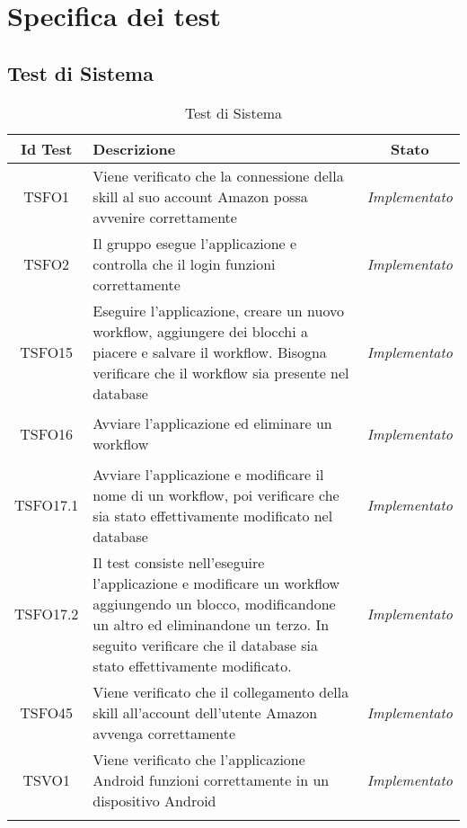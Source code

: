 \chapter{Specifica dei test}
\label{test}
\section{Test di Sistema}
\normalsize
\begin{longtable}{|c|>{}m{8cm}|c|}
\hline 
\textbf{Id Test} & \textbf{Descrizione} & \textbf{Stato}\\
\hline
\endhead
\hypertarget{TSFO1}{TSFO1} & Viene verificato che la connessione della skill al suo account Amazon possa avvenire correttamente & \textit{Implementato}\\ \hline
\hypertarget{TSFO2}{TSFO2} & Il gruppo esegue l'applicazione e controlla che il login funzioni correttamente & \textit{Implementato}\\ \hline
\hypertarget{TSFO15}{TSFO15} & Eseguire l'applicazione, creare un nuovo workflow, aggiungere dei blocchi a piacere e salvare il workflow. Bisogna verificare che il workflow sia presente nel database & \textit{Implementato}\\ \hline
\hypertarget{TSFO16}{TSFO16} & Avviare l'applicazione ed eliminare un workflow & \textit{Implementato}\\ \hline
\hypertarget{TSFO17.1}{TSFO17.1} & Avviare l'applicazione e modificare il nome di un workflow, poi verificare che sia stato effettivamente modificato nel database & \textit{Implementato}\\ \hline
\hypertarget{TSFO17.2}{TSFO17.2} & Il test consiste nell'eseguire l'applicazione e modificare un workflow aggiungendo un blocco, modificandone un altro ed eliminandone un terzo. In seguito verificare che il database sia stato effettivamente modificato. & \textit{Implementato}\\ \hline
\hypertarget{TSFO45}{TSFO45} & Viene verificato che il collegamento della skill all'account dell'utente Amazon avvenga correttamente & \textit{Implementato}\\ \hline
\hypertarget{TSVO1}{TSVO1} & Viene verificato che l'applicazione Android funzioni correttamente in un dispositivo Android & \textit{Implementato}\\ \hline
\caption[Test di Sistema]{Test di Sistema}
\label{tabella:test1}
\end{longtable}
\clearpage

